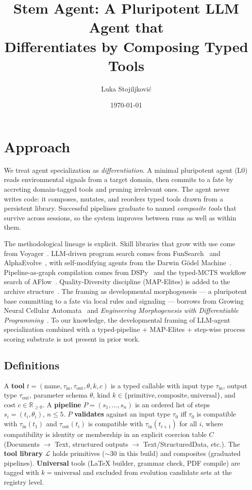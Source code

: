 \documentclass[11pt,a4paper]{article}
\title{\bfseries Stem Agent: A Pluripotent LLM Agent that\\Differentiates by Composing Typed Tools}
\author{Luka Stojiljkovi\'c}
\date{\today}
\begin{document}
\maketitle

\section{Approach}

We treat agent specialization as \emph{differentiation}. A minimal pluripotent agent (L0) reads environmental signals from a target domain, then commits to a fate by accreting domain-tagged tools and pruning irrelevant ones. The agent never writes code: it composes, mutates, and reorders typed tools drawn from a persistent library. Successful pipelines graduate to named \emph{composite tools} that survive across sessions, so the system improves between runs as well as within them.

The methodological lineage is explicit. Skill libraries that grow with use come from Voyager~\cite{voyager2023}. LLM-driven program search comes from FunSearch~\cite{funsearch2023} and AlphaEvolve~\cite{alphaevolve2025}, with self-modifying agents from the Darwin G\"odel Machine~\cite{dgm2025}. Pipeline-as-graph compilation comes from DSPy~\cite{dspy2024} and the typed-MCTS workflow search of AFlow~\cite{aflow2024}. Quality-Diversity discipline (MAP-Elites) is added to the archive structure~\cite{mapelitesai2024}. The framing as developmental morphogenesis --- a pluripotent base committing to a fate via local rules and signaling --- borrows from Growing Neural Cellular Automata~\cite{growingnca2020} and \emph{Engineering Morphogenesis with Differentiable Programming}~\cite{morphdiff2025}. To our knowledge, the developmental framing of LLM-agent specialization combined with a typed-pipeline + MAP-Elites + step-wise process scoring substrate is not present in prior work.

\subsection{Definitions}

A \textbf{tool} $t = (\text{name}, \tau_{\text{in}}, \tau_{\text{out}}, \theta, k, c)$ is a typed callable with input type $\tau_{\text{in}}$, output type $\tau_{\text{out}}$, parameter schema $\theta$, kind $k \in \{\text{primitive}, \text{composite}, \text{universal}\}$, and cost $c \in \mathbb{R}_{\geq 0}$. A \textbf{pipeline} $P = (s_1, \ldots, s_n)$ is an ordered list of steps $s_i = (t_i, \theta_i)$, $n \leq 5$. $P$ \textbf{validates} against an input type $\tau_0$ iff $\tau_0$ is compatible with $\tau_{\text{in}}(t_1)$ and $\tau_{\text{out}}(t_i)$ is compatible with $\tau_{\text{in}}(t_{i+1})$ for all $i$, where compatibility is identity or membership in an explicit coercion table $C$ (Documents $\to$ Text, structured outputs $\to$ Text/StructuredData, etc.). The \textbf{tool library} $\mathcal{L}$ holds primitives ($\sim$30 in this build) and composites (graduated pipelines). \textbf{Universal} tools (LaTeX builder, grammar check, PDF compile) are tagged with $k=\text{universal}$ and excluded from evolution candidate sets at the registry level.
\end{document}
